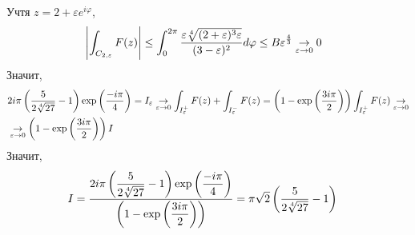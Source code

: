 Учтя $z = 2 + \varepsilon e^{i \varphi}$,
\begin{align*}
  & \left|  \int_{C_{2, \varepsilon}}F(z) \right| \leq \int_{0}^{2 \pi}\frac{\varepsilon\sqrt[4]{(2+\varepsilon)^3\varepsilon}}{(3-\varepsilon)^2}d\varphi \leq B\varepsilon^{\frac{4}{3}} \underset{\varepsilon \to 0}{\to} 0
\end{align*}
Значит,
\begin{align*}
  & 2 i \pi \left( \frac{5}{2\sqrt[4]{27}} - 1 \right)\exp\left( \frac{-i\pi}{4} \right) = I_\varepsilon \underset{\varepsilon \to 0}{\to} \int_{I_\varepsilon^+}F(z) + \int_{I_\varepsilon^-}F(z) = \left( 1 -\exp\left( \frac{3i\pi}{2}\right) \right) \int_{I_\varepsilon^+}F(z) \underset{\varepsilon \to 0}{\to} \\
  & \underset{\varepsilon \to 0}{\to} \left( 1 -\exp\left( \frac{3i\pi}{2}\right) \right) I
\end{align*}
Значит,
\begin{align*}
  & I = \frac{2 i \pi \left( \displaystyle \frac{5}{2\sqrt[4]{27}} - 1 \right)\exp\left( \displaystyle\frac{-i\pi}{4} \right)}{\left( 1 -\exp\left( \displaystyle \frac{3i\pi}{2}\right) \right)}= \pi \sqrt{2}\left( \displaystyle \frac{5}{2\sqrt[4]{27}} - 1 \right)
\end{align*}
